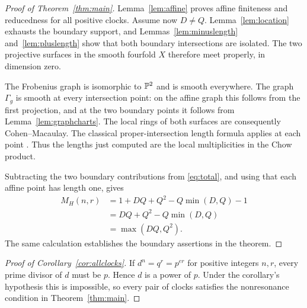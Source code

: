 \begin{proof}[Proof of Theorem~\ref{thm:main}]
Lemma~\ref{lem:affine} proves affine finiteness and reducedness for all
positive clocks. Assume now $D\ne Q$. Lemma~\ref{lem:location}
exhausts the boundary support, and Lemmas~\ref{lem:minuslength}
and~\ref{lem:pluslength} show that both boundary intersections are
isolated. The two projective surfaces in the smooth fourfold $X$
therefore meet properly, in dimension zero.

The Frobenius graph is isomorphic to $\mathbb P^2$ and is smooth everywhere.
The graph $\Gamma_g$ is smooth at every intersection point: on the
affine graph this follows from the first projection, and at the two
boundary points it follows from Lemma~\ref{lem:graphcharts}. The local
rings of both surfaces are consequently Cohen--Macaulay. The classical
proper-intersection length formula applies at each point
\cite[Lemma~43.16.1, tag~0B01]{stacks2026intersection}. Thus the lengths
just computed are the local multiplicities in the Chow product.

Subtracting the two boundary contributions from \eqref{eq:total}, and
using that each affine point has length one, gives
\begin{align*}
 M_H(n,r)
 &=1+DQ+Q^2-Q\min(D,Q)-1\\
 &=DQ+Q^2-Q\min(D,Q)\\
 &=\max(DQ,Q^2).
\end{align*}
The same calculation establishes the boundary assertions in the theorem.
\end{proof}

\begin{proof}[Proof of Corollary~\ref{cor:allclocks}]
If $d^n=q^r=p^{er}$ for positive integers $n,r$, every prime divisor of
$d$ must be $p$. Hence $d$ is a power of $p$. Under the corollary's
hypothesis this is impossible, so every pair of clocks satisfies the
nonresonance condition in Theorem~\ref{thm:main}.
\end{proof}
